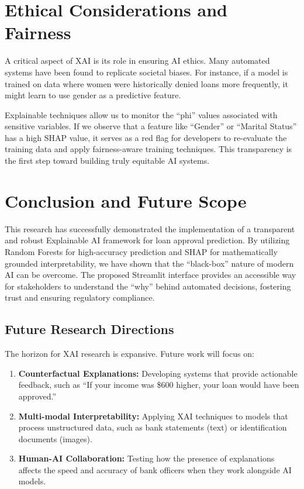 \documentclass[12pt, a4paper]{article}
\begin{document}
\section{Ethical Considerations and Fairness}

A critical aspect of XAI is its role in ensuring AI ethics. Many automated systems have been found to replicate societal biases. For instance, if a model is trained on data where women were historically denied loans more frequently, it might learn to use gender as a predictive feature.

Explainable techniques allow us to monitor the ``phi'' values associated with sensitive variables. If we observe that a feature like ``Gender'' or ``Marital Status'' has a high SHAP value, it serves as a red flag for developers to re-evaluate the training data and apply fairness-aware training techniques. This transparency is the first step toward building truly equitable AI systems.

\section{Conclusion and Future Scope}

This research has successfully demonstrated the implementation of a transparent and robust Explainable AI framework for loan approval prediction. By utilizing Random Forests for high-accuracy prediction and SHAP for mathematically grounded interpretability, we have shown that the ``black-box'' nature of modern AI can be overcome. The proposed Streamlit interface provides an accessible way for stakeholders to understand the ``why'' behind automated decisions, fostering trust and ensuring regulatory compliance.

\subsection{Future Research Directions}

The horizon for XAI research is expansive. Future work will focus on:
\begin{enumerate}
    \item \textbf{Counterfactual Explanations:} Developing systems that provide actionable feedback, such as ``If your income was \$600 higher, your loan would have been approved.''
    \item \textbf{Multi-modal Interpretability:} Applying XAI techniques to models that process unstructured data, such as bank statements (text) or identification documents (images).
    \item \textbf{Human-AI Collaboration:} Testing how the presence of explanations affects the speed and accuracy of bank officers when they work alongside AI models.
\end{enumerate}
\end{document}
